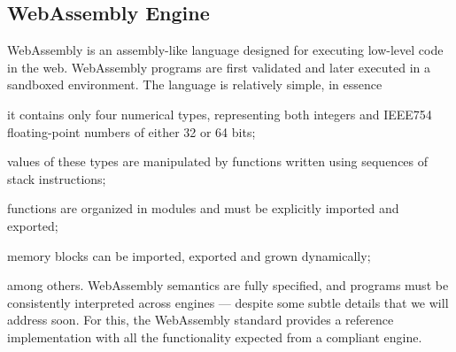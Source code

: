 \documentclass[sigconf, anonymous, review]{acmart}
\begin{document}
\subsection{WebAssembly Engine}

WebAssembly \cite{haas2017bringing} is an assembly-like language designed for
executing low-level code in the web.
%
WebAssembly programs are first validated
%
%
and later executed in a sandboxed environment.
%
%
The language is relatively simple, in essence
%
\begin{inparaenum}
  \item it contains only four numerical types, representing both integers and
    IEEE754 floating-point numbers of either 32 or 64 bits;
  \item values of these types are manipulated by functions written using
    sequences of stack instructions;
  \item functions are organized in modules and must be explicitly imported and
    exported;
  \item memory blocks can be imported, exported and grown dynamically;
\end{inparaenum}
%
among others.
%
%
WebAssembly semantics are fully specified, and programs must be consistently
interpreted across engines --- despite some subtle details that we will address
soon.
%
For this, the WebAssembly standard provides a reference implementation with all
the functionality expected from a compliant engine.
%
\end{document}
